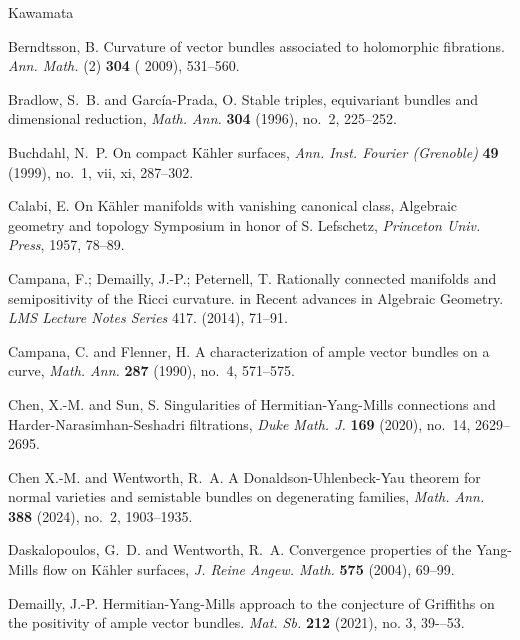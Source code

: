 \documentclass[12pt, reqno]{amsart}
\theoremstyle{plain}
\theoremstyle{definition}
\renewcommand{\>}{\rightarrow}
\renewcommand{\>}{\rightarrow}
\numberwithin{equation}{section} %
\begin{document}
%
%
\begin{thebibliography}{Kawamata}



      Berndtsson, B. Curvature of vector bundles associated to holomorphic fibrations. \emph{Ann. Math.} (2) {\bf 304} ( 2009), 531--560.







    Bradlow, S.~B. and Garc\'ia-Prada, O.  Stable triples, equivariant bundles and dimensional reduction, \emph{Math. Ann.} {\bf 304} (1996), no.~2, 225--252.

 Buchdahl, N.~P. On compact K\"ahler surfaces, \emph{Ann. Inst. Fourier (Grenoble)} {\bf 49} (1999), no.~1, vii, xi, 287--302.


    Calabi, E.  On K\"ahler manifolds with vanishing canonical class,  Algebraic geometry and topology Symposium in honor of S. Lefschetz, \emph{Princeton Univ. Press}, 1957, 78--89.


  Campana, F.; Demailly, J.-P.; Peternell, T. {Rationally connected manifolds and semipositivity of the Ricci curvature.} in Recent advances in Algebraic Geometry. \emph{LMS Lecture Notes Series}  417. (2014),
71--91. 

    Campana, C.  and Flenner, H. A characterization of ample vector bundles on a curve, \emph{Math. Ann.} {\bf 287} (1990), no.~4, 571--575.



Chen, X.-M. and  Sun, S. Singularities of Hermitian-Yang-Mills
connections and Harder-Narasimhan-Seshadri filtrations, \emph{Duke
Math. J.} {\bf 169} (2020), no.~14, 2629--2695.

    Chen X.-M.  and  Wentworth, R.~A. A Donaldson-Uhlenbeck-Yau theorem for normal varieties and semistable bundles on degenerating families, \emph{Math. Ann.} {\bf 388} (2024), no.~2, 1903--1935.

    Daskalopoulos, G.~D.  and Wentworth, R.~A.  Convergence properties of the Yang-Mills flow on K\"ahler surfaces,\emph{ J. Reine Angew. Math.} {\bf 575} (2004), 69--99.

    Demailly, J.-P.
    Hermitian-Yang-Mills approach to the conjecture of Griffiths on the positivity of ample vector bundles.
   \emph{ Mat. Sb.} \textbf{212} (2021), no. 3, 39-–53.



\end{thebibliography}
\end{document}
